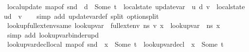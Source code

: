\begin{isabellebody}
\endisatagproof
{\isafoldproof}%
%
\isadelimproof
\isanewline
%
\endisadelimproof
\isanewline
{}\isamarkupfalse%
\ local{\isacharunderscore}{\kern0pt}update{\isacharcolon}{\kern0pt}\ {\isachardoublequoteopen}map{\isacharunderscore}{\kern0pt}of\ {\isacharparenleft}{\kern0pt}snd\ {\isasymLambda}{\isacharparenright}{\kern0pt}\ d\ {\isacharequal}{\kern0pt}\ Some\ t\ {\isasymLongrightarrow}\ {\isacharparenleft}{\kern0pt}local{\isacharunderscore}{\kern0pt}state\ {\isacharparenleft}{\kern0pt}update{\isacharunderscore}{\kern0pt}var\ {\isasymLambda}\ u\ d\ v{\isacharparenright}{\kern0pt}{\isacharparenright}{\kern0pt}\ {\isacharequal}{\kern0pt}\ {\isacharparenleft}{\kern0pt}local{\isacharunderscore}{\kern0pt}state\ u{\isacharparenright}{\kern0pt}{\isacharparenleft}{\kern0pt}d\ {\isasymmapsto}\ v{\isacharparenright}{\kern0pt}{\isachardoublequoteclose}\isanewline
%
\isadelimproof
\ \ %
\endisadelimproof
%
\isatagproof
{}\isamarkupfalse%
\ {\isacharparenleft}{\kern0pt}simp\ add{\isacharcolon}{\kern0pt}\ update{\isacharunderscore}{\kern0pt}var{\isacharunderscore}{\kern0pt}def\ split{\isacharcolon}{\kern0pt}\ option{\isachardot}{\kern0pt}split{\isacharparenright}{\kern0pt}%
\endisatagproof
{\isafoldproof}%
%
\isadelimproof
\isanewline
%
\endisadelimproof
\isanewline
{}\isamarkupfalse%
\ lookup{\isacharunderscore}{\kern0pt}full{\isacharunderscore}{\kern0pt}ext{\isacharunderscore}{\kern0pt}env{\isacharunderscore}{\kern0pt}same{\isacharcolon}{\kern0pt}\ {\isachardoublequoteopen}lookup{\isacharunderscore}{\kern0pt}var\ {\isasymLambda}\ {\isacharparenleft}{\kern0pt}full{\isacharunderscore}{\kern0pt}ext{\isacharunderscore}{\kern0pt}env\ ns\ v{\isacharparenright}{\kern0pt}\ x\ {\isacharequal}{\kern0pt}\ lookup{\isacharunderscore}{\kern0pt}var\ {\isasymLambda}\ ns\ x{\isachardoublequoteclose}\isanewline
%
\isadelimproof
\ \ %
\endisadelimproof
%
\isatagproof
{}\isamarkupfalse%
\ {\isacharparenleft}{\kern0pt}simp\ add{\isacharcolon}{\kern0pt}\ lookup{\isacharunderscore}{\kern0pt}var{\isacharunderscore}{\kern0pt}binder{\isacharunderscore}{\kern0pt}upd{\isacharparenright}{\kern0pt}%
\endisatagproof
{\isafoldproof}%
%
\isadelimproof
\isanewline
%
\endisadelimproof
\isanewline
{}\isamarkupfalse%
\ lookup{\isacharunderscore}{\kern0pt}var{\isacharunderscore}{\kern0pt}decl{\isacharunderscore}{\kern0pt}local{\isacharcolon}{\kern0pt}\ {\isachardoublequoteopen}map{\isacharunderscore}{\kern0pt}of\ {\isacharparenleft}{\kern0pt}snd\ {\isasymLambda}{\isacharparenright}{\kern0pt}\ x\ {\isacharequal}{\kern0pt}\ Some\ t\ {\isasymLongrightarrow}\ lookup{\isacharunderscore}{\kern0pt}var{\isacharunderscore}{\kern0pt}decl\ {\isasymLambda}\ x\ {\isacharequal}{\kern0pt}\ Some\ t{\isachardoublequoteclose}\isanewline

\end{isabellebody}
